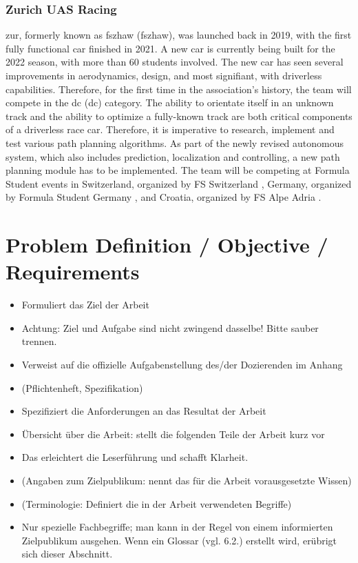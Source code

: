 \subsubsection{Zurich UAS Racing}
\acrlong{zur}, formerly known as \acrlong{fszhaw} (\acrshort{fszhaw}), was launched back in 2019, with the first fully functional car finished in 2021. A new car is currently being built for the 2022 season, with more than 60 students involved. The new car has seen several improvements in aerodynamics, design, and most signifiant, with driverless capabilities. \cite{fszhaw_launch}
Therefore, for the first time in the association's history, the team will compete in the \acrlong{dc} (\acrshort{dc}) category.
The ability to orientate itself in an unknown track and the ability to optimize a fully-known track are both critical components of a driverless race car. Therefore, it is imperative to research, implement and test various path planning algorithms. As part of the newly revised autonomous system, which also includes prediction, localization and controlling, a new path planning module has to be implemented.
The team will be competing at Formula Student events in Switzerland, organized by FS Switzerland \cite{fsswitzerland}, Germany, organized by Formula Student Germany \cite{fs_germany}, and Croatia, organized by FS Alpe Adria \cite{fs_alpe_adria}.

\section{Problem Definition / Objective / Requirements}
\begin{itemize}
    \item Formuliert das Ziel der Arbeit
    \item Achtung: Ziel und Aufgabe sind nicht zwingend dasselbe! Bitte sauber trennen.
    \item Verweist auf die offizielle Aufgabenstellung des/der Dozierenden im Anhang
    \item (Pflichtenheft, Spezifikation)
    \item Spezifiziert die Anforderungen an das Resultat der Arbeit
    \item Übersicht über die Arbeit: stellt die folgenden Teile der Arbeit kurz vor
    \item Das erleichtert die Leserführung und schafft Klarheit.
    \item (Angaben zum Zielpublikum: nennt das für die Arbeit vorausgesetzte Wissen)
    \item (Terminologie: Definiert die in der Arbeit verwendeten Begriffe)
    \item Nur spezielle Fachbegriffe; man kann in der Regel von einem informierten Zielpublikum ausgehen.
    Wenn ein Glossar (vgl. 6.2.) erstellt wird, erübrigt sich dieser Abschnitt.
\end{itemize}

